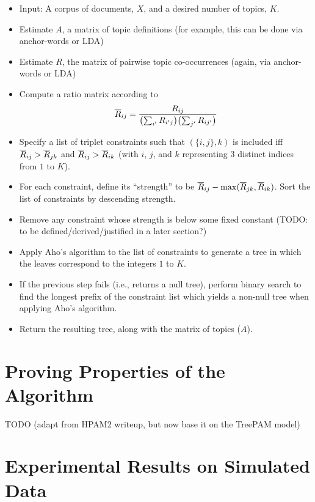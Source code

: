 \documentclass{article}
\theoremstyle{definition}
\begin{document}
\begin{itemize}
  \item Input: A corpus of documents, $X$, and a desired number of topics, $K$.
  \item Estimate $A$, a matrix of topic definitions (for example, this can be done via anchor-words or LDA)
  \item Estimate $R$, the matrix of pairwise topic co-occurrences (again, via anchor-words or LDA)
  \item Compute a ratio matrix according to
  \begin{align}
  \overline{R}_{ij} = \frac{R_{ij}}{ \bigl( \sum_{i'} R_{i'j} \bigr) \bigl( \sum_{j'} R_{ij'} \bigr) }
  \end{align}
  \item Specify a list of triplet constraints such that $(\{i, j\}, k)$ is included iff $\overline{R}_{ij} > \overline{R}_{jk}$ and $\overline{R}_{ij} > \overline{R}_{ik}$ (with $i$, $j$, and $k$ representing 3 distinct indices from $1$ to $K$).
  \item For each constraint, define its ``strength'' to be $\overline{R}_{ij} - \max(\overline{R}_{jk}, \overline{R}_{ik})$.
        Sort the list of constraints by descending strength.
  \item Remove any constraint whose strength is below some fixed constant (TODO: to be defined/derived/justified in a later section?)
  \item Apply Aho's algorithm to the list of constraints to generate a tree in which the leaves correspond to the integers $1$ to $K$.
  \item If the previous step fails (i.e., returns a null tree), perform binary search to find the longest prefix of the constraint list which yields a non-null tree when applying Aho's algorithm.
  \item Return the resulting tree, along with the matrix of topics ($A$).
\end{itemize}


\section{Proving Properties of the Algorithm}

TODO (adapt from HPAM2 writeup, but now base it on the TreePAM model)

\section{Experimental Results on Simulated Data}
\end{document}
